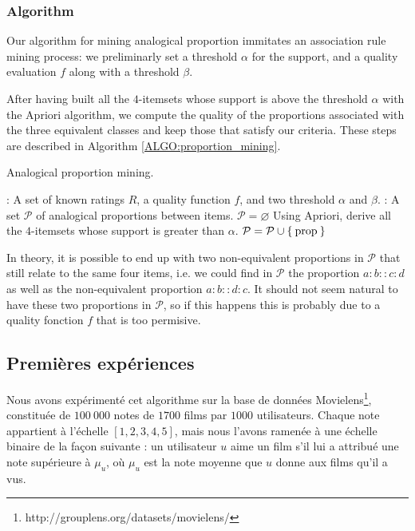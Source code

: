 \subsubsection{Algorithm}

Our algorithm for mining analogical proportion immitates an association rule
mining process: we preliminarly set a threshold $\alpha$ for the support, and a
quality evaluation $f$ along with a threshold $\beta$.

After having built all the $4$-itemsets whose support is above the threshold
$\alpha$ with the Apriori algorithm, we compute the quality of the proportions
associated with the three equivalent classes and keep those that satisfy our
criteria. These steps are described in Algorithm \ref{ALGO:proportion_mining}.

 \begin{algorithm}[!ht]
   \caption{Analogical proportion mining.}
       \label{ALGO:bruteforce}
       \begin{algorithmic}

      : A set of known ratings $R$, a quality function $f$,
         and two threshold $\alpha$ and $\beta$.
         : A set $\mathcal{P}$ of analogical proportions
         between items.
         \STATE $\mathcal{P} = \varnothing$
      \STATE Using Apriori, derive all the $4$-itemsets whose support is
         greater than $\alpha$.
         \STATE $\mathcal{P} = \mathcal{P} \cup \Set{\text{prop}}$
         \ENDIF
         \ENDFOR
         \ENDFOR
\end{algorithmic}
\end{algorithm}

In theory, it is possible to end up with two non-equivalent proportions in
$\mathcal{P}$ that still relate to the same four items, i.e. we could find in
$\mathcal{P}$ the proportion $a:b::c:d$ as well as the non-equivalent
proportion $a:b::d:c$. It should not seem natural to have these two proportions
in $\mathcal{P}$, so if this happens this is probably due to a quality fonction
$f$ that is too permisive.

\subsection{Premières expériences}

Nous avons expérimenté cet algorithme sur la base de données
Movielens\footnote{http://grouplens.org/datasets/movielens/},
constituée de $100~000$ notes de $1700$ films par $1000$ utilisateurs. Chaque
note appartient à l'échelle $[1, 2, 3, 4, 5]$, mais nous l'avons ramenée à une
échelle binaire de la façon suivante : un utilisateur $u$ aime un film s'il lui
a attribué une note supérieure à $\mu_u$, où $\mu_u$ est la note moyenne que
$u$ donne aux films qu'il a vus.

